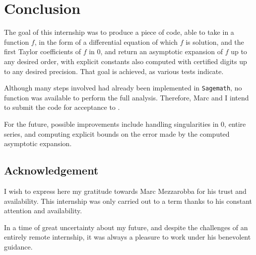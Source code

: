 \documentclass[../main.tex]{subfiles}
\begin{document}
\chapter{Conclusion}

The goal of this internship was to produce a piece of code, able to take in a function $f$, in the form of a differential equation of which $f$ is solution, and the first Taylor coefficients of $f$ in 0, and return an asymptotic expansion of $f$ up to any desired order, with explicit constants also computed with certified digits up to any desired precision. That goal is achieved, as various tests indicate.

Although many steps involved had already been implemented in \verb|Sagemath|, no function was available to perform the full analysis.
Therefore, Marc and I intend to submit the code for acceptance to .

For the future, possible improvements include handling singularities in 0, entire series, and computing explicit bounds on the error made by the computed asymptotic expansion.

\section*{Acknowledgement}

I wish to express here my gratitude towards Marc Mezzarobba for his trust and availability. This internship was only carried out to a term thanks to his constant attention and availability.

In a time of great uncertainty about my future, and despite the challenges of an entirely remote internship, it was always a pleasure to work under his benevolent guidance.
\end{document}
